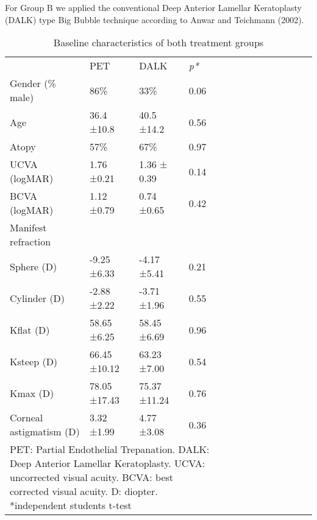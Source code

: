 \documentclass[authordate, empirical,issue]{jote-new-article}
\begin{document}
	For Group B we applied the conventional Deep Anterior Lamellar Keratoplasty (DALK) type Big Bubble technique according to Anwar and Teichmann (2002).

	\begin{table}[H]
		\begin{fullwidth}
			\caption{Baseline characteristics of both treatment groups}
			\begin{tabularx}{\linewidth}{@{} l l l l l l l l l l l l l l l @{}}
				\toprule
	
			 	  &   & PET & DALK & \emph{p*} \\
	
			 	\multicolumn{2}{l}{Gender (\% male)} & 86\% & 33\% & 0.06 \\
	
			 	\multicolumn{2}{l}{Age} & 36.4 ±10.8 & 40.5 ±14.2 & 0.56 \\
	
			 	\multicolumn{2}{l}{Atopy} & 57\% & 67\% & 0.97 \\
	
			 	\multicolumn{2}{l}{UCVA (logMAR)} & 1.76 ±0.21 & 1.36 ± 0.39 & 0.14 \\
	
			 	\multicolumn{2}{l}{BCVA (logMAR)} & 1.12 ±0.79 & 0.74 ±0.65 & 0.42 \\
	
			 	\multicolumn{2}{l}{Manifest refraction} &   &   &   \\
	
			 	\multicolumn{2}{l}{Sphere (D)} & -9.25 ±6.33 & -4.17 ±5.41 & 0.21 \\
	
			 	\multicolumn{2}{l}{Cylinder (D)} & -2.88 ±2.22 & -3.71 ±1.96 & 0.55 \\
	
			 	\multicolumn{2}{l}{Kflat (D)} & 58.65 ±6.25 & 58.45 ±6.69 & 0.96 \\
	
			 	\multicolumn{2}{l}{Ksteep (D)} & 66.45 ±10.12 & 63.23 ±7.00 & 0.54 \\
	
			 	\multicolumn{2}{l}{Kmax (D)} & 78.05 ±17.43 & 75.37 ±11.24 & 0.76 \\
	
			 	\multicolumn{2}{l}{Corneal astigmatism (D)} & 3.32 ±1.99 & 4.77 ±3.08 & 0.36 \\
	
				\bottomrule
				\multicolumn{5}{l}{\parbox[t]{0.9\textwidth}{PET: Partial Endothelial Trepanation. DALK: Deep Anterior Lamellar Keratoplasty. UCVA: uncorrected visual acuity. BCVA: best corrected visual acuity. D: diopter. *independent students t-test}}
			\end{tabularx}	
		\end{fullwidth}
	\end{table}
\end{document}
